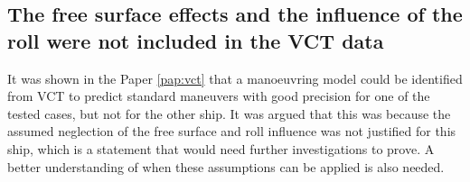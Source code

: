\subsection*{The free surface effects and the influence of the roll were not included in the VCT data}
It was shown in the Paper \ref{pap:vct} that a manoeuvring model could be identified from VCT to predict standard maneuvers with good precision for one of the tested cases, but not for the other ship. 
It was argued that this was because the assumed neglection of the free surface and roll influence was not justified for this ship, which is a statement that would need further investigations to prove. A better understanding of when these assumptions can be applied is also needed.   
        
